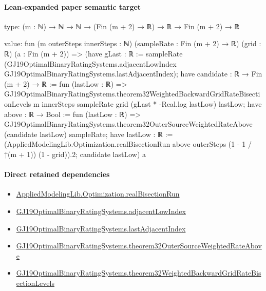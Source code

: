 \documentclass[10pt]{article}
\begin{document}
\paragraph{Lean-expanded paper semantic target}
\begin{ReviewVerbatim}
type:
(m : ℕ) → ℕ → ℕ → (Fin (m + 2) → ℝ) → ℝ → Fin (m + 2) → ℝ

value:
fun (m outerSteps innerSteps : ℕ) (sampleRate : Fin (m + 2) → ℝ) (grid : ℝ) (a : Fin (m + 2)) =>
  (have gLast : ℝ :=
      sampleRate (GJ19OptimalBinaryRatingSystems.adjacentLowIndex GJ19OptimalBinaryRatingSystems.lastAdjacentIndex);
    have candidate : ℝ → Fin (m + 2) → ℝ := fun (lastLow : ℝ) =>
      GJ19OptimalBinaryRatingSystems.theorem32WeightedBackwardGridRateBisectionLevels m innerSteps sampleRate grid
        (gLast * -Real.log lastLow) lastLow;
    have above : ℝ → Bool := fun (lastLow : ℝ) =>
      GJ19OptimalBinaryRatingSystems.theorem32OuterSourceWeightedRateAbove (candidate lastLow) sampleRate;
    have lastLow : ℝ :=
      (AppliedModelingLib.Optimization.realBisectionRun above outerSteps (1 - 1 / ↑(m + 1)) (1 - grid)).2;
    candidate lastLow)
    a
\end{ReviewVerbatim}

\paragraph{Direct retained dependencies}
\begin{itemize}\raggedright
\item \hyperlink{governing-declaration-eeb9a77742be2459}{Applied\allowbreak{}Modeling\allowbreak{}Lib.\allowbreak{}Optimization.\allowbreak{}real\allowbreak{}Bisection\allowbreak{}Run}
\item \hyperlink{governing-declaration-6d6631db7a243715}{GJ19\allowbreak{}Optimal\allowbreak{}Binary\allowbreak{}Rating\allowbreak{}Systems.\allowbreak{}adjacent\allowbreak{}Low\allowbreak{}Index}
\item \hyperlink{governing-declaration-52fd1b4c72f89380}{GJ19\allowbreak{}Optimal\allowbreak{}Binary\allowbreak{}Rating\allowbreak{}Systems.\allowbreak{}last\allowbreak{}Adjacent\allowbreak{}Index}
\item \hyperlink{governing-declaration-78490fb97264725d}{GJ19\allowbreak{}Optimal\allowbreak{}Binary\allowbreak{}Rating\allowbreak{}Systems.\allowbreak{}theorem32\allowbreak{}Outer\allowbreak{}Source\allowbreak{}Weighted\allowbreak{}Rate\allowbreak{}Above}
\item \hyperlink{governing-declaration-9379a614c6add799}{GJ19\allowbreak{}Optimal\allowbreak{}Binary\allowbreak{}Rating\allowbreak{}Systems.\allowbreak{}theorem32\allowbreak{}Weighted\allowbreak{}Backward\allowbreak{}Grid\allowbreak{}Rate\allowbreak{}Bisection\allowbreak{}Levels}
\end{itemize}
\end{document}
